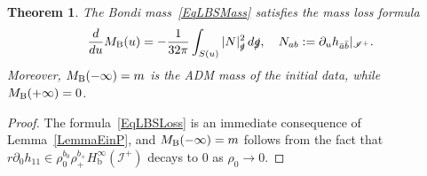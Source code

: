 \documentclass[reqno,11pt,letterpaper]{amsart}
\numberwithin{equation}{section}
\numberwithin{figure}{section}
\newtheorem{thm}{Theorem}[section]
\theoremstyle{definition}
\theoremstyle{remark}
\newcommand{\ms}{\mathscr}
\newcommand{\scri}{\ms I}
\newcommand{\slg}{\slashed{g}{}}
\newcommand{\pa}{\partial}
\newcommand{\bop}{{\mathrm{b}}}
\newcommand{\Hb}{H_{\bop}}
\begin{document}
\begin{thm}
\label{ThmLBSLoss}
  The Bondi mass~\eqref{EqLBSMass} satisfies the \emph{mass loss formula}
  \begin{equation}
  \label{EqLBSLoss}
    \frac{d}{d u}M_{\rm B}(u) = -\frac{1}{32\pi}\int_{S(u)} |N|_{\slg}^2 \,d\slg,\quad N_{a b}:=\pa_u h_{\bar a\bar b}|_{\scri^+}.
  \end{equation}
  Moreover, $M_{\rm B}(-\infty)=m$ is the ADM mass of the initial data, while $M_{\rm B}(+\infty)=0$.
\end{thm}
\begin{proof}
  The formula~\eqref{EqLBSLoss} is an immediate consequence of Lemma~\ref{LemmaEinP}, and $M_{\rm B}(-\infty)=m$ follows from the fact that $r\pa_0 h_{1 1}\in\rho_0^{b_0}\rho_+^{b_+}\Hb^\infty(\scri^+)$ decays to $0$ as $\rho_0\to 0$.
  

\end{proof}
\end{document}
